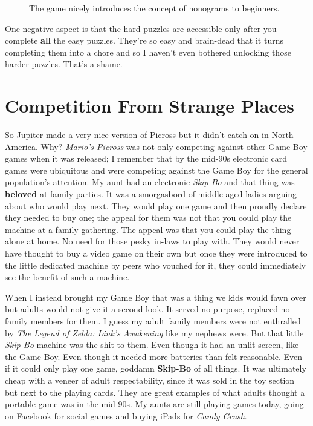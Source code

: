 \documentclass{book}
\begin{document}
\FloatBarrier\vspace{\baselineskip}\begin{figure}[H]\caption*{The game nicely introduces the concept of nonograms to beginners.}\end{figure}
One negative aspect is that the hard puzzles are accessible only after you complete \textbf{all} the easy puzzles. They’re so easy and brain-dead that it turns completing them into a chore and so I haven’t even bothered unlocking those harder puzzles. That’s a shame.\par
\FloatBarrier\section*{Competition From Strange Places}
So Jupiter made a very nice version of Picross but it didn’t catch on in North America. Why? \emph{Mario’s Picross} was not only competing against other Game Boy games when it was released; I remember that by the mid-90s electronic card games were ubiquitous and were competing against the Game Boy for the general population’s attention. My aunt had an electronic \emph{Skip-Bo} and that thing was \textbf{beloved} at family parties. It was a smorgasbord of middle-aged ladies arguing about who would play next. They would play one game and then proudly declare they needed to buy one; the appeal for them was not that you could play the machine at a family gathering. The appeal was that you could play the thing alone at home. No need for those pesky in-laws to play with. They would never have thought to buy a video game on their own but once they were introduced to the little dedicated machine by peers who vouched for it, they could immediately see the benefit of such a machine.\par
\FloatBarrier\vspace{\baselineskip}\begin{figure}[H]\end{figure}
When I instead brought my Game Boy that was a thing we kids would fawn over but adults would not give it a second look. It served no purpose, replaced no family members for them. I guess my adult family members were not enthralled by \emph{The Legend of Zelda: Link’s Awakening} like my nephews were. But that little \emph{Skip-Bo} machine was the shit to them. Even though it had an unlit screen, like the Game Boy. Even though it needed more batteries than felt reasonable. Even if it could only play one game, goddamn \textbf{Skip-Bo} of all things. It was ultimately cheap with a veneer of adult respectability, since it was sold in the toy section but next to the playing cards. They are great examples of what adults thought a portable game was in the mid-90s. My aunts are still playing games today, going on Facebook for social games and buying iPads for \emph{Candy Crush}.\par
\end{document}

